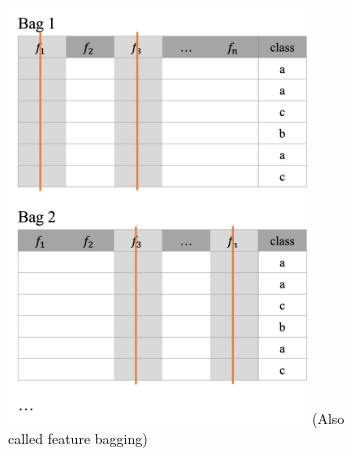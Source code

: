 \begin{figure}[h]
\begin{subfigure}{0.32\textwidth}
    \includegraphics[width=0.87\textwidth]{assets/trees/id3/ensemble_feature_bagging.png}
    \textcolor{black}{\footnotesize(Also called feature bagging)}
  \end{subfigure}
  \begin{subfigure}{0.32\textwidth}
    \centering

\end{subfigure}
\end{figure}
